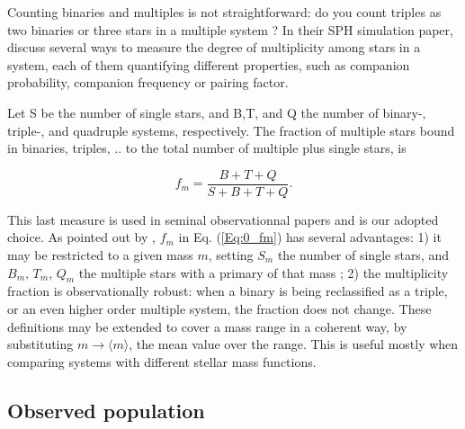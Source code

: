 Counting binaries and multiples is not straightforward: do you count triples as two binaries or three stars in a multiple system ? In their SPH simulation paper, \cite{Goodwin2004a} discuss several ways to measure the degree of multiplicity among stars in a system, each of them quantifying different properties, such as companion probability, companion frequency or pairing factor. 

Let  S be the number of single stars, and B,T, and Q the number of binary-, triple-, and quadruple systems, respectively. The fraction of multiple stars bound in binaries, triples, .. to the total number of multiple plus single stars, is

\begin{equation}
\label{Eq:0_fm} 
f_m = \frac{B + T + Q}{S + B + T + Q}. 
\end{equation}

This last  measure is used in seminal observationnal papers \citep{DM91,Raghavan2010} and is our adopted choice. As pointed out by \cite{Hubber2005}, $f_m$ in Eq. (\ref{Eq:0_fm}) has several advantages: 1) it  may be  restricted to a given mass $m$, setting  $S_m$ the number of single stars, and $B_m,\, T_m,\, Q_m$  the multiple stars with a primary of that mass ;  2)  the multiplicity fraction is observationally robust: when a binary is being reclassified as a triple, or an even higher order multiple system, the fraction does not change. 
 These definitions may be extended to cover a mass range  in a coherent way, by substituting $m \rightarrow \langle m\rangle$, the mean value over the range. This is useful mostly when comparing  systems with different stellar mass functions. 


\subsection{Observed population}

